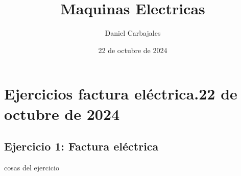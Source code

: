\documentclass{report}
\title{\Huge{Maquinas Electricas}}
\author{\large{Daniel Carbajales}}
\date{22 de octubre de 2024}
\begin{document}
  \section*{Ejercicios factura eléctrica.\hfill22 de octubre de 2024}
    \subsection*{Ejercicio 1: Factura eléctrica}
      cosas del ejercicio
\end{document}
